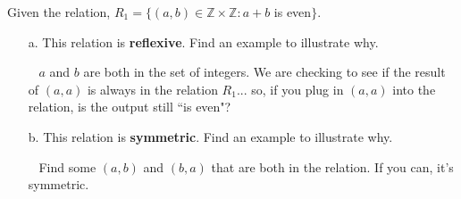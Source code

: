 \documentclass[a4paper,12pt]{book}
\newcounter{question}
\begin{document}
    \begin{questionNOGRADE}{\thequestion}

        Given the relation, $R_{1} = \{ (a,b) \in \mathbb{Z} \times \mathbb{Z} : a + b$ is even$\}$.

        \begin{itemize}
            \item[a.]   This relation is \textbf{reflexive}. Find an example to illustrate why.
                \begin{hint}{\ }
                    $a$ and $b$ are both in the set of integers. We are checking to see if the
                    result of $(a,a)$ is always in the relation $R_{1}$... so,
                    if you plug in $(a,a)$ into the relation, is the output still ``is even"?
                \end{hint}


            \item[b.]   This relation is \textbf{symmetric}. Find an example to illustrate why.
                \begin{hint}{\ }
                    Find some $(a,b)$ and $(b,a)$ that are both in the relation.
                    If you can, it's symmetric.
                \end{hint}
                
        \end{itemize}
        
    \end{questionNOGRADE}

\newpage
\end{document}
